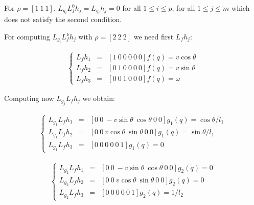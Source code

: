 \documentclass[letterpaper, 10 pt, conference]{ieeeconf}  %
\begin{document}
For ${\rho = [1\ 1\ 1]}$, ${L_{g_i}L_f^0h_j = L_{g_i}h_j = 0}$ for all ${1 \leq i \leq p}$, for all ${1 \leq j \leq m}$ which does not satisfy the second condition.

%

For computing $L_{g_i}L_f^kh_j$ with $\rho = [2\ 2\ 2]$ we need first $L_fh_j$:

\begin{eqnarray}
\left\lbrace\begin{array}{lcl}
L_{f}h_1 & = & [1\ 0\ 0\ 0\ 0\ 0]f(q) = v\cos\theta\\
L_{f}h_2 & = & [0\ 1\ 0\ 0\ 0\ 0]f(q) = v\sin\theta\\
L_{f}h_3 & = & [0\ 0\ 1\ 0\ 0\ 0]f(q) = \omega
\end{array}\right.
\end{eqnarray}

Computing now $L_{g_j}L_fh_j$ we obtain:

\begin{eqnarray}
\left\lbrace\begin{array}{lcl}
L_{g_1}L_{f}h_1 & = & [0\ 0\ -v\sin\theta\ \cos\theta\ 0\ 0]g_1(q) = \cos\theta/l_1\\
L_{g_1}L_{f}h_2 & = & [0\ 0\ v\cos\theta\ \sin\theta\ 0\ 0]g_1(q) = \sin\theta/l_1\\
L_{g_1}L_{f}h_3 & = & [0\ 0\ 0\ 0\ 0\ 1]g_1(q) = 0
\end{array}\right.
\end{eqnarray}

\begin{eqnarray}
\left\lbrace\begin{array}{lcl}
L_{g_2}L_{f}h_1 & = & [0\ 0\ -v\sin\theta\ \cos\theta\ 0\ 0]g_2(q) = 0\\
L_{g_2}L_{f}h_2 & = & [0\ 0\ v\cos\theta\ \sin\theta\ 0\ 0]g_2(q) = 0\\
L_{g_2}L_{f}h_3 & = & [0\ 0\ 0\ 0\ 0\ 1]g_2(q) = 1/l_2
\end{array}\right.
\end{eqnarray}
\end{document}
